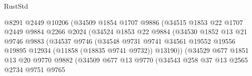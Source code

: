 \begin{lexlean}{RustStd}
\begin{coremodule}
                                @8291
                                @2449
                                @10206
                                (@34509
                                  @1854
                                  @1707
                                  @9886
                                  (@34515
                                    @1853
                                    @22
                                    @1707
                                    @2449
                                    @9884
                                    @2266
                                    @2024
                                    (@34524
                                      @1853
                                      @22
                                      @9884
                                      (@34530
                                        @1852
                                        @13
                                        @21
                                        @9746
                                        @9883
                                        (@34537
                                          @9746
                                          (@34548
                                            @9731
                                            @9741
                                            @34561
                                            @19552
                                            @19556
                                            @19895
                                            @12934
                                            (@11858 (@18835 @9741 @9732))
                                            @13190))
                                        (@34529
                                          @677
                                          @1851
                                          @13
                                          @20
                                          @9770
                                          @9882
                                          (@34509
                                            @677
                                            @13
                                            @9770
                                            (@34543
                                              @258
                                              @37
                                              @13
                                              @2565
                                              @2734
                                              @9751
                                              @9765

\end{coremodule}
\end{lexlean}
